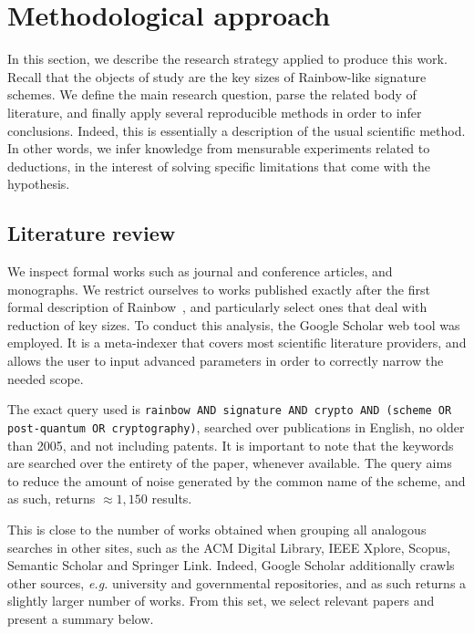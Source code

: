 \documentclass[openright, draft, 10pt]{report}
\begin{document}

\section{Methodological approach}

In this section, we describe the research strategy applied to produce this work. Recall that the objects of study are the key sizes of Rainbow-like signature schemes. We define the main research question, parse the related body of literature, and finally apply several reproducible methods in order to infer conclusions. Indeed, this is essentially a description of the usual scientific method. In other words, we infer knowledge from mensurable experiments related to deductions, in the interest of solving specific limitations that come with the hypothesis.

\subsection{Literature review}\label{subsec:related}

We inspect formal works such as journal and conference articles, and monographs. We restrict ourselves to works published exactly after the first formal description of Rainbow~\cite{Ding:200506:inproc}, and particularly select ones that deal with reduction of key sizes. To conduct this analysis, the Google Scholar web tool was employed. It is a meta-indexer that covers most scientific literature providers, and allows the user to input advanced parameters in order to correctly narrow the needed scope.

The exact query used is \texttt{rainbow AND signature AND crypto AND (scheme OR post-quantum OR cryptography)}, searched over publications in English, no older than 2005, and not including patents. It is important to note that the keywords are searched over the entirety of the paper, whenever available. The query aims to reduce the amount of noise generated by the common name of the scheme, and as such, returns $\approx 1{,}150$ results. 

This is close to the number of works obtained when grouping all analogous searches in other sites, such as the ACM Digital Library, IEEE Xplore, Scopus, Semantic Scholar and Springer Link. Indeed, Google Scholar additionally crawls other sources, \emph{e.g.} university and governmental repositories, and as such returns a slightly larger number of works. From this set, we select relevant papers and present a summary below.
\end{document}
